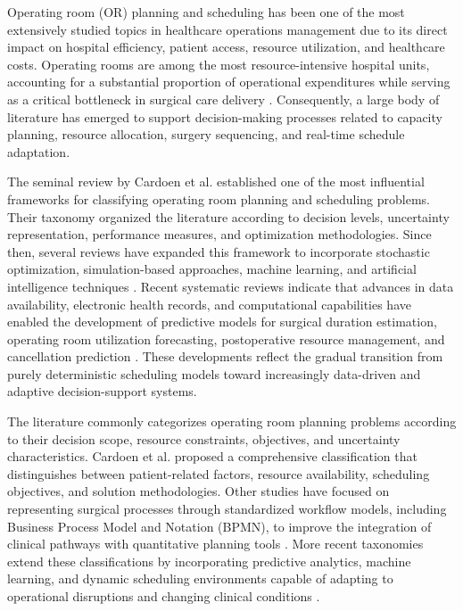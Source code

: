 \documentclass[sn-mathphys-num]{sn-jnl}
\begin{document}
    Operating room (OR) planning and scheduling has been one of the most extensively studied topics in healthcare operations management due to its direct impact on hospital efficiency, patient access, resource utilization, and healthcare costs. Operating rooms are among the most resource-intensive hospital units, accounting for a substantial proportion of operational expenditures while serving as a critical bottleneck in surgical care delivery \cite{cardoen2010,barbagallo2015}. Consequently, a large body of literature has emerged to support decision-making processes related to capacity planning, resource allocation, surgery sequencing, and real-time schedule adaptation.
    
    The seminal review by Cardoen et al. \cite{cardoen2010} established one of the most influential frameworks for classifying operating room planning and scheduling problems. Their taxonomy organized the literature according to decision levels, uncertainty representation, performance measures, and optimization methodologies. Since then, several reviews have expanded this framework to incorporate stochastic optimization, simulation-based approaches, machine learning, and artificial intelligence techniques \cite{al-amin2024,bellini2024,chamarthi2025}. Recent systematic reviews indicate that advances in data availability, electronic health records, and computational capabilities have enabled the development of predictive models for surgical duration estimation, operating room utilization forecasting, postoperative resource management, and cancellation prediction \cite{bellini2020,espaillat2024}. These developments reflect the gradual transition from purely deterministic scheduling models toward increasingly data-driven and adaptive decision-support systems.
    
    The literature commonly categorizes operating room planning problems according to their decision scope, resource constraints, objectives, and uncertainty characteristics. Cardoen et al. \cite{cardoen2010} proposed a comprehensive classification that distinguishes between patient-related factors, resource availability, scheduling objectives, and solution methodologies. Other studies have focused on representing surgical processes through standardized workflow models, including Business Process Model and Notation (BPMN), to improve the integration of clinical pathways with quantitative planning tools \cite{barbagallo2015}. More recent taxonomies extend these classifications by incorporating predictive analytics, machine learning, and dynamic scheduling environments capable of adapting to operational disruptions and changing clinical conditions \cite{chamarthi2025}.
    
\end{document}
